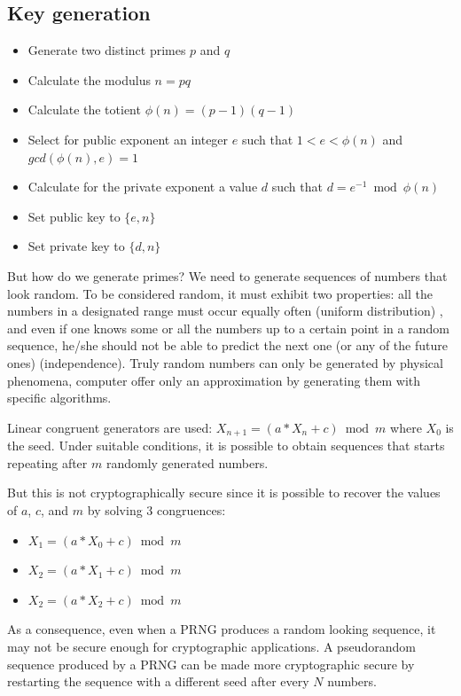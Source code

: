 \subsection{Key generation}
\begin{itemize}
	\item Generate two distinct primes $p$ and $q$
	\item Calculate the modulus $n = p q$
	\item Calculate the totient $\phi(n) = (p - 1) (q - 1)$
	\item Select for public exponent an integer $e$ such that $1 < e < \phi(n)$ and $gcd(\phi(n), e) = 1$
	\item Calculate for the private exponent a value $d$ such that $d = e^{-1} \bmod \phi(n)$
	\item Set public key to $\{e, n\}$
	\item Set private key to $\{d, n\}$
\end{itemize}

But how do we generate primes? We need to generate sequences of numbers that look random. To be considered random, it must exhibit two properties: all the numbers in a designated range must occur equally often (uniform distribution) , and even if one knows some or all the numbers up to a certain point in a random sequence, he/she should not be able to predict the next one (or any of the future ones) (independence). 
Truly random numbers can only be generated by physical phenomena, computer offer only an approximation by generating them with specific algorithms.

Linear congruent generators are used: $X_{n+1} = (a * X_n + c) \bmod m$ where $X_0$ is the seed. Under suitable conditions, it is possible to obtain sequences that starts repeating after $m$ randomly generated numbers.

But this is not cryptographically secure since it is possible to recover the values of $a$, $c$, and $m$ by solving 3 congruences:
\begin{itemize}
	\item $X_1 = (a * X_0 + c) \bmod m$
	\item $X_2 = (a * X_1 + c) \bmod m$
	\item $X_2 = (a * X_2 + c) \bmod m$
\end{itemize}

As a consequence, even when a PRNG produces a random looking sequence, it may not be secure enough for cryptographic applications.  A pseudorandom sequence produced by a PRNG can be made more cryptographic secure by restarting the sequence with a different seed after every $N$ numbers.

